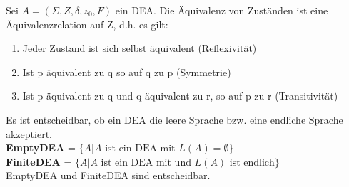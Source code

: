\documentclass[14pt]{article}
\begin{document}
\begin{eigenschaft}
    Sei $A = (\varSigma, Z, \delta, z_0, F)$ ein DEA. Die Äquivalenz von
    Zuständen ist eine Äquivalenzrelation auf Z, d.h. es gilt:
    \begin{enumerate}
        \item Jeder Zustand ist sich selbst äquivalent (Reflexivität)
        \item Ist p äquivalent zu q so auf q zu p (Symmetrie)
        \item Ist p äquivalent zu q und q äquivalent zu r, so auf p zu r
        (Transitivität)
    \end{enumerate}
\end{eigenschaft}
\begin{definition}
    Es ist entscheidbar, ob ein DEA die leere Sprache bzw. eine endliche Sprache
    akzeptiert. \\
    \textbf{EmptyDEA} = $\{ A | A \text{ ist ein DEA mit } L(A) = \emptyset \}$ \\
    \textbf{FiniteDEA} = $\{ A | A \text{ ist ein DEA mit und } L(A) \text{ ist endlich} \}$ \\
    EmptyDEA und FiniteDEA sind entscheidbar.
\end{definition}
\end{document}
